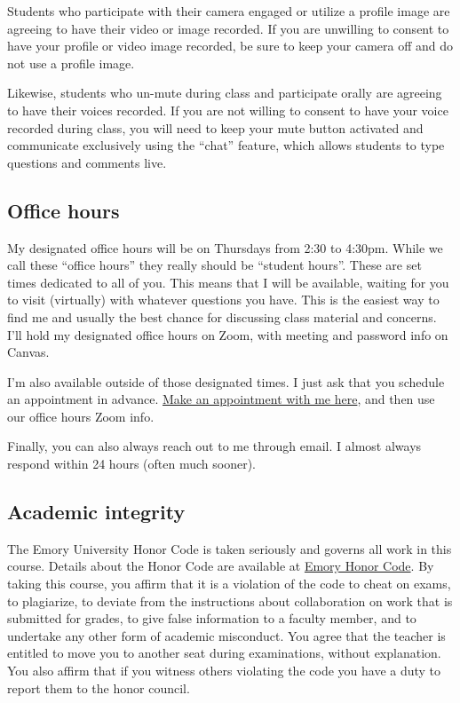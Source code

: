 \documentclass[11pt,]{article}
\begin{document}
Students who participate with their camera engaged or utilize a profile
image are agreeing to have their video or image recorded. If you are
unwilling to consent to have your profile or video image recorded, be
sure to keep your camera off and do not use a profile image.

Likewise, students who un-mute during class and participate orally are
agreeing to have their voices recorded. If you are not willing to
consent to have your voice recorded during class, you will need to keep
your mute button activated and communicate exclusively using the
``chat'' feature, which allows students to type questions and comments
live.

\hypertarget{office-hours}{%
\subsection{Office hours}\label{office-hours}}

My designated office hours will be on Thursdays from 2:30 to 4:30pm.
While we call these ``office hours'' they really should be ``student
hours''. These are set times dedicated to all of you. This means that I
will be available, waiting for you to visit (virtually) with whatever
questions you have. This is the easiest way to find me and usually the
best chance for discussing class material and concerns. I'll hold my
designated office hours on Zoom, with meeting and password info on
Canvas.

I'm also available outside of those designated times. I just ask that
you schedule an appointment in advance.
\href{https://mccarthy-meetings.youcanbook.me/}{Make an appointment with
me here}, and then use our office hours Zoom info.

Finally, you can also always reach out to me through email. I almost
always respond within 24 hours (often much sooner).

\hypertarget{academic-integrity}{%
\subsection{Academic integrity}\label{academic-integrity}}

The Emory University Honor Code is taken seriously and governs all work
in this course. Details about the Honor Code are available at
\href{http://catalog.college.emory.edu/academic/policies-regulations/honor-code.html}{Emory
Honor Code}. By taking this course, you affirm that it is a violation of
the code to cheat on exams, to plagiarize, to deviate from the
instructions about collaboration on work that is submitted for grades,
to give false information to a faculty member, and to undertake any
other form of academic misconduct. You agree that the teacher is
entitled to move you to another seat during examinations, without
explanation. You also affirm that if you witness others violating the
code you have a duty to report them to the honor council.
\end{document}

